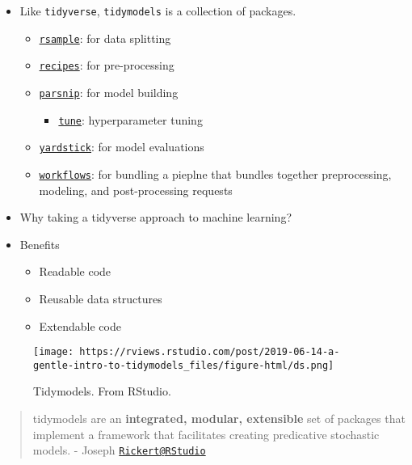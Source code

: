 \documentclass[
]{book}
\providecommand{\tightlist}{%
  \setlength{\itemsep}{0pt}\setlength{\parskip}{0pt}}
\begin{document}
\begin{itemize}
\item
  Like \texttt{tidyverse}, \texttt{tidymodels} is a collection of packages.

  \begin{itemize}
  \item
    \href{https://rsample.tidymodels.org/}{\texttt{rsample}}: for data splitting
  \item
    \href{https://recipes.tidymodels.org/index.html}{\texttt{recipes}}: for pre-processing
  \item
    \href{https://www.tidyverse.org/blog/2018/11/parsnip-0-0-1/}{\texttt{parsnip}}: for model building

    \begin{itemize}
    \tightlist
    \item
      \href{https://github.com/tidymodels/tune}{\texttt{tune}}: hyperparameter tuning
    \end{itemize}
  \item
    \href{https://github.com/tidymodels/yardstick}{\texttt{yardstick}}: for model evaluations
  \item
    \href{https://github.com/tidymodels/workflows}{\texttt{workflows}}: for bundling a pieplne that bundles together preprocessing, modeling, and post-processing requests
  \end{itemize}
\item
  Why taking a tidyverse approach to machine learning?
\item
  Benefits

  \begin{itemize}
  \item
    Readable code
  \item
    Reusable data structures
  \item
    Extendable code
  \end{itemize}
\end{itemize}

\begin{figure}
\centering
\texttt{[image: https://rviews.rstudio.com/post/2019-06-14-a-gentle-intro-to-tidymodels\_files/figure-html/ds.png]}
\caption{Tidymodels. From RStudio.}
\end{figure}

\begin{quote}
tidymodels are an \textbf{integrated, modular, extensible} set of packages that implement a framework that facilitates creating predicative stochastic models. - Joseph \href{mailto:Rickert@RStudio}{\nolinkurl{Rickert@RStudio}}
\end{quote}
\end{document}
